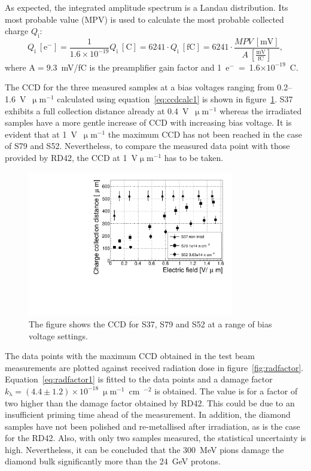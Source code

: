 As expected, the integrated amplitude spectrum is a Landau distribution. Its most probable value (MPV) is used to calculate the most probable collected charge $Q_\mathrm{i}$:
\begin{equation}
\label{eq:ccdcalc}
Q_\mathrm{i}~[\mathrm{e}^-] 
= \frac{1} {1.6\times 10^{-19}} Q_\mathrm{i}~[\mathrm{C}] 
= 6241 \cdot Q_\mathrm{i}~[\mathrm{fC}] 
= 6241 \cdot \frac{MPV~[\mathrm{mV}]}{A~[\frac{\mathrm{mV}}{\mathrm{fC}}]}
,
\end{equation} 
where A$=9.3$~mV/fC is the preamplifier gain factor and 1~e$^-$~=~1.6$\times10^{-19}$~C. 

The CCD for the three measured samples at a bias voltages ranging from 0.2--1.6~V~$\upmu$m$^{-1}$ calculated using equation~\ref{eq:ccdcalc1} is shown in figure~\ref{fig:ccd}. S37 exhibits a full collection distance already at 0.4~V~$\upmu$m$^{-1}$ whereas the irradiated samples have a more gentle increase of CCD with increasing bias voltage. It is evident that at 1~V~$\upmu$m$^{-1}$  the maximum CCD has not been reached in the case of S79 and S52. Nevertheless, to compare the measured data point with those provided by RD42, the CCD at 1~V$\upmu$m$^{-1}$ has to be taken.

\begin{figure}[!t]
\begin{center}
\includegraphics[width=0.8\textwidth]{03_measurement_results/scripts/plots/ccd}
\caption{The figure shows the CCD for S37, S79 and S52 at a range of bias voltage settings.}
\label{fig:ccd}
\end{center}
\end{figure}

The data points with the maximum CCD obtained in the test beam measurements are plotted against received radiation dose in figure~\ref{fig:radfactor}. Equation~\ref{eq:radfactor1} is fitted to the data points and a damage factor $k_{\mathrm{\lambda}}=(4.4\pm1.2)\times10^{-18}~\upmu$m$^{-1}$~cm~$^{-2}$ is obtained. The value is for a factor of two higher than the damage factor obtained by RD42. %
This could be due to an insufficient priming time ahead of the measurement. In addition, the diamond samples have not been polished and re-metallised after irradiation, as is the case for the RD42. Also, with only two samples measured, the statistical uncertainty is high. Nevertheless, it can be concluded that the 300~MeV pions damage the diamond bulk significantly more than the 24~GeV protons.



